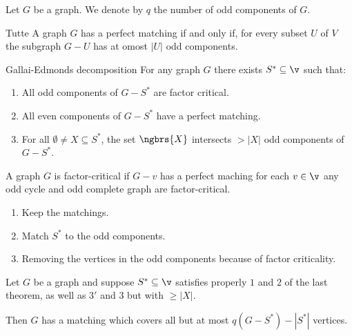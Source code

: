 Let $G$ be a graph. We denote by $\mathit{q}$ the number of odd components of $G$.
\begin{customtheorem}{Tutte}
\label{theorem:tutte}
    A graph $G$ has a perfect matching if and only if, for every subset $U$ of $V$ the subgraph $G - U$ has at omost $|U|$ odd components.
\end{customtheorem}
\begin{customtheorem}{Gallai-Edmonds decomposition}
\label{theorem:gallai-edmonds}
    For any graph $G$ there exists $S^* \subseteq \v$ such that:
    \begin{enumerate}
        \item All odd components of $G - S^*$ are factor critical.
        \item All even components of $G - S^*$ have a perfect matching.
        \item For all $\emptyset \neq X \subseteq S^*$, the set $\ngbrs{X}$ intersects $> |X|$ odd components of $G - S^*$.
    \end{enumerate}
\end{customtheorem}
A graph $G$ is factor-critical if $G - v$ has a perfect maching for each $v \in \v$ any odd cycle and odd complete graph are factor-critical.
\begin{enumerate}
    \item Keep the matchings.
    \item Match $S^*$ to the odd components.
    \item Removing the vertices in the odd components because of factor criticality.
\end{enumerate}
\begin{customlemma}{2.8}
\label{lemma:2.8}
    Let $G$ be a graph and suppose $S^* \subseteq \v$ satisfies properly $1$ and $2$ of the last theorem, as well as $3'$ and $3$ but with $\geq |X|$.
\end{customlemma}
Then $G$ has a matching which covers all but at most $\mathit{q}(G - S^*) - |S^*|$ vertices.
